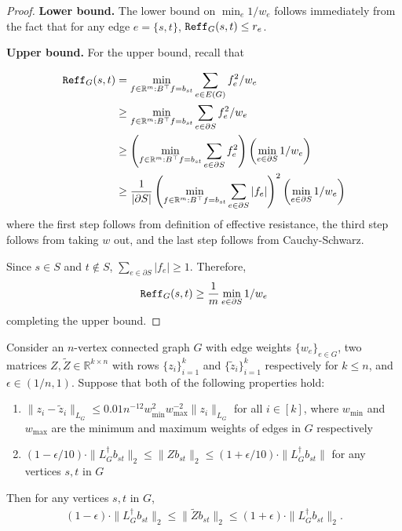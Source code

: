 \begin{proof}

{\bf Lower bound.}
The lower bound on $\min_e 1/w_e$ follows immediately from the fact that for any edge $e = \{s,t\}$, $\mathtt{Reff}_G(s,t)\le r_e$.



{\bf Upper bound.}
For the upper bound, recall that

\begin{align*}
\mathtt{Reff}_G(s,t) &= \min_{f\in \mathbb{R}^m : B^\top f = b_{st}} \sum_{e\in E(G)} f_e^2/w_e\\
&\ge \min_{f\in \mathbb{R}^m : B^\top f = b_{st}} \sum_{e\in \partial S} f_e^2/w_e\\
&\ge \left(\min_{f\in \mathbb{R}^m : B^\top f = b_{st}} \sum_{e\in \partial S} f_e^2\right)\left(\min_{e\in \partial S} 1/w_e\right)\\
&\ge \frac{1}{|\partial S|} \left(\min_{f\in \mathbb{R}^m : B^\top f = b_{st}} \sum_{e\in \partial S} |f_e|\right)^2\left(\min_{e\in \partial S} 1/w_e\right)
\end{align*}
where the first step follows from definition of effective resistance, 
the third step follows from taking $w$ out, and the last step follows from Cauchy-Schwarz.

Since $s\in S$ and $t\notin S$, $\sum_{e\in \partial S} |f_e|\ge 1$. Therefore,
\begin{align*}
\mathtt{Reff}_G(s,t) \ge \frac{1}{m}\min_{e\in \partial S} 1/w_e
\end{align*}
completing the upper bound.
\end{proof}

\begin{proposition}\label{prop:lapl-error}
Consider an $n$-vertex connected graph $G$ with edge weights $\{w_e\}_{e\in G}$, two matrices $Z,\tilde{Z}\in \mathbb{R}^{k\times n}$ with rows $\{z_i\}_{i=1}^k$ and $\{\tilde{z}_i\}_{i=1}^k$ respectively for $k\le n$, and $\epsilon\in (1/n,1)$. Suppose that both of the following properties hold:
\begin{enumerate}
    \item $\|z_i - \tilde{z}_i\|_{L_G} \le 0.01 n^{-12} w_{\min}^2 w_{\max}^{-2}\|z_i\|_{L_G}$ 
for all $i\in [k]$, where $w_{\min}$ and $w_{\max}$ are the minimum and maximum weights of edges in $G$ respectively
    \item $(1 - \epsilon/10) \cdot \| L_G^{\dagger} b_{st}\|_2 \le \|Zb_{st}\|_2 \le (1 + \epsilon/10) \cdot \|L_G^{\dagger}b_{st}\|$ for any vertices $s,t$ in $G$
\end{enumerate}

Then for any vertices $s,t$ in $G$,
\begin{align*}
(1 - \epsilon) \cdot \|L_G^{\dagger} b_{st}\|_2 \le \|\tilde{Z} b_{st}\|_2 \le (1 + \epsilon) \cdot \|L_G^{\dagger} b_{st}\|_2.
\end{align*}
\end{proposition}

